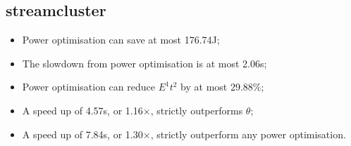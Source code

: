 \subsection{streamcluster}
\begin{itemize}
  \item Power optimisation can save at most 176.74J;
  \item The slowdown from power optimisation is at most 2.06s;
  \item Power optimisation can reduce $E^1t^2$ by at most 29.88\%;
  \item A speed up of 4.57s, or 1.16$\times$, strictly outperforms $\theta$;
  \item A speed up of 7.84s, or 1.30$\times$, strictly outperform any power optimisation.
\end{itemize}



